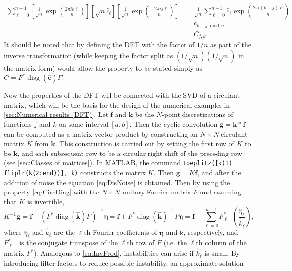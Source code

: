 \documentclass[12pt,notitlepage]{report}
\newcommand{\gVec}{\mathbf{g}}	%
\newcommand{\gnoiseVec}{\widetilde{\mathbf{g}}}	%
\newcommand{\kVec}{\mathbf{k}}	%
\newcommand{\kMat}{K}	%
\newcommand{\fVec}{\mathbf{f}}	%
\newcommand{\ctrans}{*}	%
\DeclareMathOperator{\diag}{diag}	%
\newcommand{\noise}{\eta}	%
\newcommand{\noiseVec}{\bm{\noise}}	%
\begin{document}
\begin{align*}
\sum_{\ell=0}^{n-1} \left[\frac{1}{\sqrt{n}}  \exp\left(\frac{2\pi{i}k\ell}{n}\right)\right] \left[\sqrt{n}\widehat{c}_\ell\right] \left[\frac{1}{\sqrt{n}} \exp\left(\frac{-2\pi{i}j\ell}{n}\right)\right] &= \frac{1}{\sqrt{n}} \sum_{\ell=0}^{n-1} \widehat{c}_\ell \exp\left(\frac{2\pi{i}(k-j)\ell}{n}\right) \\
&= c_{k-j \bmod n} \\
&= C_{j,k}.
\end{align*}
It should be noted that by defining the DFT with the factor of $1/n$ as part of the inverse transformation (while keeping the factor split as $(1/\sqrt{n})(1/\sqrt{n})$ in the matrix form) would allow the property to be stated simply as $C = F^\ctrans\diag(\widehat{\mathbf{c}})F$. \par 
Now the properties of the DFT will be connected with the SVD of a circulant matrix, which will be the basis for the design of the numerical examples in \ref{sec:Numerical results (DFT)}. Let $\fVec$ and $\kVec$ be the $N$-point discretizations of functions $f$ and $k$ on some interval $[a,b]$. Then the cyclic convolution $\gVec = \kVec * \fVec$ can be computed as a matrix-vector product by constructing an $N \times N$ circulant matrix $\kMat$ from $\kVec$. This construction is carried out by setting the first row of $\kMat$ to be $\kVec$, and each subsequent row to be a circular right shift of the preceding row (see \ref{sec:Classes of matrices}). In MATLAB, the command \texttt{toeplitz([k(1) fliplr(k(2:end))], k)} constructs the matrix $\kMat$. Then $\gVec = \kMat\fVec$, and after the addition of noise the equation \eqref{eq:DisNoise} is obtained. Then by using the property \eqref{eq:CircDiag} with the $N \times N$ unitary Fourier matrix $F$ and assuming that $\kMat$ is invertible, 
\begin{equation}
\kMat^{-1}\gnoiseVec = \fVec + (F^\ctrans\diag(\widehat{\kVec})F)^{-1}\noiseVec = \fVec + F^\ctrans\diag(\widehat{\kVec})^{-1}F\noiseVec = \fVec + \sum_{\ell = 0}^{n-1} F^\ctrans_{\ell,\cdot}\left(\frac{\widehat{\noise}_\ell}{\widehat{k}_\ell}\right),
\label{eq:InvProdDFT}
\end{equation}
where $\widehat{\noise}_\ell$ and $\widehat{k}_\ell$ are the $\ell$th Fourier coefficients of $\noiseVec$ and $\kVec$, respectively, and $F^\ctrans_{\ell,\cdot}$ is the conjugate transpose of the $\ell$th row of $F$ (i.e. the $\ell$th column of the matrix $F^\ctrans$). Analogous to \eqref{eq:InvProd}, instabilities can arise if $\widehat{k}_\ell$ is small. By introducing filter factors to reduce possible instability, an approximate solution
\end{document}
